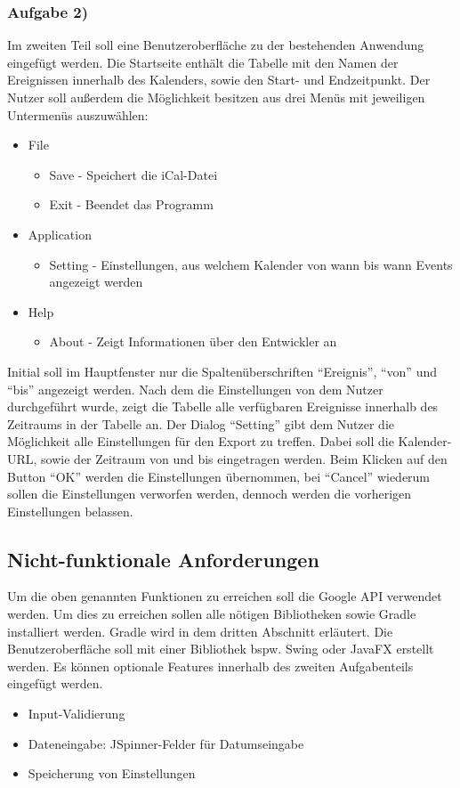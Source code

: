 \documentclass[a4paper]{article}
\begin{document}
	
	\subsubsection{Aufgabe 2)}
	Im zweiten Teil soll eine Benutzeroberfläche zu der bestehenden Anwendung eingefügt werden.
	Die Startseite enthält die Tabelle mit den Namen der Ereignissen innerhalb des Kalenders, sowie den Start- und Endzeitpunkt. Der Nutzer soll außerdem die Möglichkeit besitzen aus drei Menüs mit jeweiligen Untermenüs auszuwählen:
	\pagebreak
	\begin{itemize}
		\item File
			\begin{itemize}
				\item Save - Speichert die iCal-Datei
				\item Exit - Beendet das Programm
			\end{itemize}
		\item Application
			\begin{itemize}
				\item Setting - Einstellungen, aus welchem Kalender von wann bis wann Events angezeigt werden
			\end{itemize}
		\item Help
			\begin{itemize}
				\item About - Zeigt Informationen über den Entwickler an
			\end{itemize}
	\end{itemize}
	Initial soll im Hauptfenster nur die Spaltenüberschriften ``Ereignis'', ``von'' und ``bis'' angezeigt werden. Nach dem die Einstellungen von dem Nutzer durchgeführt wurde, zeigt die Tabelle alle verfügbaren Ereignisse innerhalb des Zeitraums in der Tabelle an.
	Der Dialog ``Setting'' gibt dem Nutzer die Möglichkeit alle Einstellungen für den Export zu treffen. Dabei soll die Kalender-URL, sowie der Zeitraum von und bis eingetragen werden. Beim Klicken auf den Button ``OK'' werden die Einstellungen übernommen, bei ``Cancel'' wiederum sollen die Einstellungen verworfen werden, dennoch werden die vorherigen Einstellungen belassen.
	
	\subsection{Nicht-funktionale Anforderungen}
	Um die oben genannten Funktionen zu erreichen soll die Google API verwendet werden. Um dies zu erreichen sollen alle nötigen Bibliotheken sowie Gradle installiert werden. Gradle wird in dem dritten Abschnitt erläutert.
	Die Benutzeroberfläche soll mit einer Bibliothek bspw. Swing oder JavaFX erstellt werden. Es können optionale Features innerhalb des zweiten Aufgabenteils eingefügt werden.
	\begin{itemize}
		\item Input-Validierung
		\item Dateneingabe: JSpinner-Felder für Datumseingabe
		\item Speicherung von Einstellungen
	\end{itemize}
	
\end{document}
